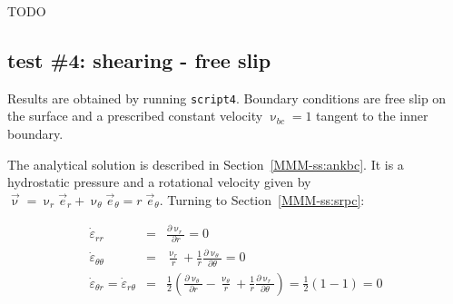 TODO




\subsection*{test \#4: shearing - free slip}

Results are obtained by running {\tt script4}. Boundary conditions are 
free slip on the surface and a prescribed constant velocity $\upnu_{bc}=1$ tangent 
to the inner boundary.

The analytical solution is described in Section~\ref{MMM-ss:ankbc}.
It is a hydrostatic pressure and a rotational velocity given by $\vec{\upnu}=\upnu_r \vec{e}_r + \upnu_\theta \vec{e}_\theta = r \; \vec{e}_\theta$.
Turning to Section~\ref{MMM-ss:srpc}:

\begin{eqnarray}
\dot\varepsilon_{rr}  &=& \frac{\partial \upnu_r}{\partial r}  = 0\\
\dot\varepsilon_{\theta\theta}  &=& \frac{\upnu_r}{r} + \frac{1}{r} \frac{\partial \upnu_\theta}{\partial \theta} =0 \\
\dot\varepsilon_{\theta r} = \dot\varepsilon_{r\theta}  &=& \frac{1}{2} \left(   \frac{\partial \upnu_\theta}{\partial r} - \frac{\upnu_\theta}{r} 
+\frac{1}{r} \frac{\partial \upnu_r}{\partial \theta}  \right)  = \frac12 (1-1) =0
\end{eqnarray}


